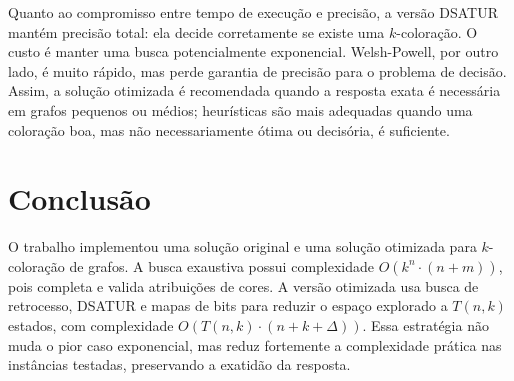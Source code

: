 \documentclass[12pt]{article}
\begin{document}
Quanto ao compromisso entre tempo de execução e precisão, a versão DSATUR mantém
precisão total: ela decide corretamente se existe uma $k$-coloração. O custo é
manter uma busca potencialmente exponencial. Welsh-Powell, por outro lado, é
muito rápido, mas perde garantia de precisão para o problema de decisão. Assim,
a solução otimizada é recomendada quando a resposta exata é necessária em grafos
pequenos ou médios; heurísticas são mais adequadas quando uma coloração boa,
mas não necessariamente ótima ou decisória, é suficiente.

\section{Conclusão}

O trabalho implementou uma solução original e uma solução otimizada para
$k$-coloração de grafos. A busca exaustiva possui complexidade
$O(k^n \cdot (n+m))$, pois completa e valida atribuições de cores. A versão
otimizada usa busca de retrocesso, DSATUR e mapas de bits para reduzir o espaço
explorado a $T(n,k)$ estados, com complexidade $O(T(n,k)\cdot(n+k+\Delta))$.
Essa estratégia não muda o pior caso exponencial, mas reduz fortemente a
complexidade prática nas instâncias testadas, preservando a exatidão da resposta.


\nocite{brelaz1979new,lewis2021guide,welsh1967upper,jung2017rustbelt,pereira2017energy}

\end{document}
